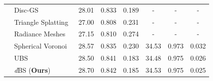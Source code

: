 \begin{table}[thp]
{\begin{tabular}{cl|ccc|ccc}
         &Disc-GS \citep{qu2024disc}
           &28.01&0.833&0.189
           &-&-&-\\
         & Triangle Splatting~\citep{held2025triangle}
           &27.00&0.808&0.231
           &-&-&-\\
         & Radiance Meshes~\citep{radiancemesh}
           &27.15&0.810&0.274
           &-&-&-\\
         & Spherical Voronoi~\citep{di2025spherical}
           & \cellcolor{orange!25}28.57 & 0.835 & 0.230
           & \cellcolor{red!25}34.53 & \cellcolor{orange!25}0.973 & 0.032\\
         & UBS\citep{liu2025universal}
           & 28.50 & \cellcolor{orange!25}0.841 & \cellcolor{red!25}0.183
           & \cellcolor{orange!25}34.48 & \cellcolor{red!25}0.975 & \cellcolor{orange!25}0.026\\
         & \textit{d}BS (\textbf{Ours})
           & \cellcolor{red!25}28.70 & \cellcolor{red!25}0.842 & \cellcolor{orange!25}0.185
           & \cellcolor{red!25}34.53 & \cellcolor{red!25}0.975 & \cellcolor{red!25}0.025\\
        \bottomrule
    \end{tabular}}
    \label{tab:sota}
\end{table}
